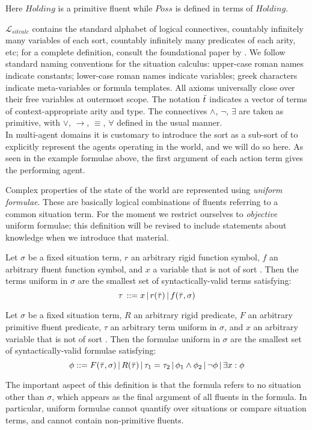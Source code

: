 Here $Holding$ is a primitive fluent while $Poss$ is defined in
terms of $Holding$.\medskip{}


$\mathcal{L}_{sitcalc}$ contains the standard alphabet of logical
connectives, countably infinitely many variables of each sort, countably
infinitely many predicates of each arity, etc; for a complete definition,
consult the foundational paper by \citet{pirri99contributions_sitcalc}.
We follow standard naming conventions for the situation calculus:
upper-case roman names indicate constants; lower-case roman names
indicate variables; greek characters indicate meta-variables or formula
templates. All axioms universally close over their free variables
at outermost scope. The notation $\bar{t}$ indicates a vector of
terms of context-appropriate arity and type. The connectives $\wedge$,
$\neg$, $\exists$ are taken as primitive, with $\vee$, $\rightarrow$,
$\equiv$, $\forall$ defined in the usual manner.\\


In multi-agent domains it is customary to introduce the sort as a sub-sort of  to explicitly represent the agents
operating in the world, and we will do so here. As seen in the example
formulae above, the first argument of each action term gives the performing
agent.

\medskip{}
 Complex properties of the state of the world are represented using
\emph{uniform formulae}. These are basically logical combinations
of fluents referring to a common situation term. For the moment we
restrict ourselves to \emph{objective} uniform formulae; this definition
will be revised to include statements about knowledge when we introduce
that material.

\begin{defnL}
 Let $\sigma$ be a fixed situation term,
$r$ an arbitrary rigid function symbol, $f$ an arbitrary fluent
function symbol, and $x$ a variable that is not of sort .
Then the terms uniform in $\sigma$ are the smallest set of syntactically-valid
terms satisfying:\[
\tau\,::=x\,|\, r(\bar{\tau})\,|\, f(\bar{\tau},\sigma)\]

\begin{defnL}
 Let $\sigma$ be a fixed situation
term, $R$ an arbitrary rigid predicate, $F$ an arbitrary primitive
fluent predicate, $\tau$ an arbitrary term uniform in $\sigma$,
and $x$ an arbitrary variable that is not of sort .
Then the formulae uniform in $\sigma$ are the smallest set of syntactically-valid
formulae satisfying:\[
\phi::=F(\bar{\tau},\sigma)\,|\, R(\bar{\tau})\,|\,\tau_{1}=\tau_{2}\,|\,\phi_{1}\wedge\phi_{2}\,|\,\neg\phi\,|\,\exists x:\phi\]

\end{defnL}
\end{defnL}
The important aspect of this definition is that the formula refers
to no situation other than $\sigma$, which appears as the final argument
of all fluents in the formula. In particular, uniform formulae cannot
quantify over situations or compare situation terms, and cannot contain
non-primitive fluents.

